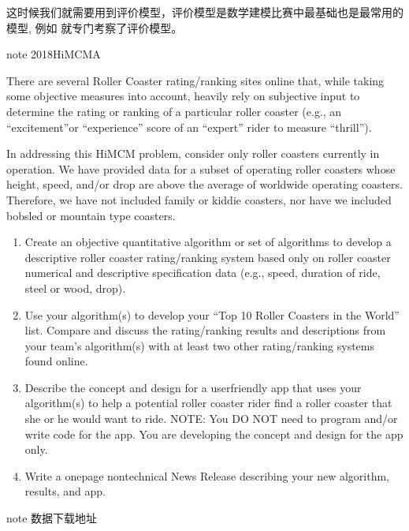 \documentclass[letterpaper,10pt,english]{sphinxmanual}
\let\sphinxpxdimen\pdfpxdimen\else\newdimen\sphinxpxdimen
\begin{document}
\begin{figure}[htbp]
\centering

\noindent\sphinxincludegraphics[height=300\sphinxpxdimen]{{0}.jpg}
\end{figure}

这时候我们就需要用到评价模型，评价模型是数学建模比赛中最基础也是最常用的模型, 例如 就专门考察了评价模型。

\begin{sphinxadmonition}{note}{ 2018HiMCM\sphinxhyphen{}A}

There are several Roller Coaster rating/ranking sites online that, while taking some objective measures into account, heavily rely on subjective input to determine the rating or ranking of a particular roller coaster (e.g., an “excitement”or “experience” score of an “expert” rider to measure “thrill”).

In addressing this HiMCM problem, consider only roller coasters currently in operation. We have provided data for a subset of operating roller coasters whose height, speed, and/or drop are above the average of worldwide operating coasters. Therefore, we have not included family or kiddie coasters, nor have we included bobsled or mountain type coasters.
\begin{enumerate}
%
\item {} 
Create an objective quantitative algorithm or set of algorithms to develop a descriptive roller coaster rating/ranking system based only on roller coaster numerical and descriptive specification data (e.g., speed, duration of ride, steel or wood, drop).

\item {} 
Use your algorithm(s) to develop your “Top 10 Roller Coasters in the World” list. Compare and discuss the rating/ranking results and descriptions from your team’s algorithm(s) with at least two other rating/ranking systems found online.

\item {} 
Describe the concept and design for a user\sphinxhyphen{}friendly app that uses your algorithm(s) to help a potential roller coaster rider find a roller coaster that she or he would want to ride. NOTE: You DO NOT need to program and/or write code for the app. You are developing the concept and design for the app only.

\item {} 
Write a one\sphinxhyphen{}page non\sphinxhyphen{}technical News Release describing your new algorithm, results, and app.

\end{enumerate}

\begin{sphinxadmonition}{note}{ 数据下载地址}

\end{sphinxadmonition}
\end{sphinxadmonition}
\end{document}
